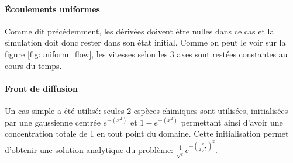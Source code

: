 \paragraph{Écoulements uniformes}
Comme dit précédemment, les dérivées doivent être nulles dans ce cas et la simulation doit donc rester dans son état initial. Comme on peut le voir sur la figure \ref{fig:uniform_flow}, les vitesses selon les 3 axes sont restées constantes au cours du temps.
 

\paragraph{Front de diffusion}
Un cas simple a été utilisé: seules 2 espèces chimiques sont utilisées, initialisées par une gaussienne centrée $e^{-(x^2)}$ et $1-e^{-(x^2)}$ permettant ainsi d'avoir une concentration totale de 1 en tout point du domaine. Cette initialisation permet d'obtenir une solution analytique du problème: $\frac{1}{\sqrt{t}}e^{-\left(\frac{x}{2\sqrt{t}}\right)^2}$.






